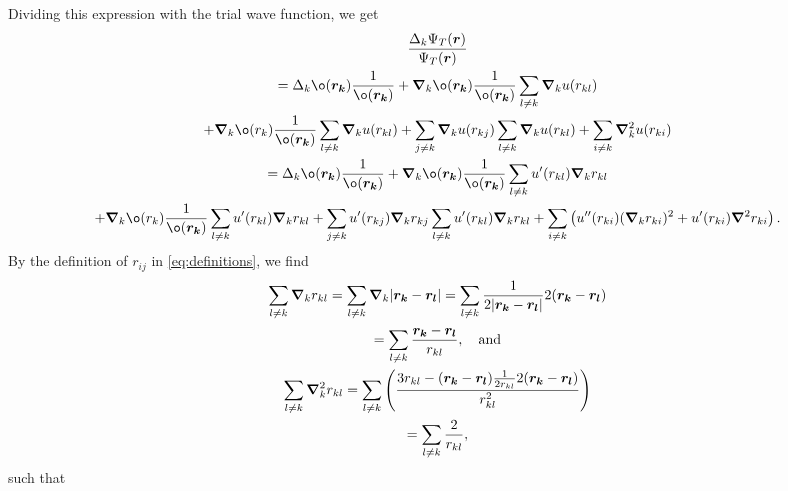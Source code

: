 Dividing this expression with the trial wave function, we get
\begin{gather*}
	\frac{\Delta _{k} \Psi _{T}(\boldsymbol{r})}{\Psi _{T}(\boldsymbol{r})}\\
	=\Delta _{k}ø(\boldsymbol{r_k})\frac{1}{ø(\boldsymbol{r_k})} + \grad _{k}ø(\boldsymbol{r_k}) \frac{1}{ø(\boldsymbol{r_k})} \sum_{l \neq  k} \boldsymbol{\nabla} _ku(r _{kl})\\
	+\boldsymbol{ \nabla }_kø(r_k)  \frac{1}{ø(\boldsymbol{r_k})} \sum_{l
		\neq  k} \boldsymbol{\nabla} _ku(r _{kl}) + \sum_{j \neq k}^{}
	\grad_ku(r _{kj})\sum_{l \neq k}^{} \grad_ku(r _{kl})
	+\sum_{i \neq k} \grad^2 _ku(r _{ki})\\
	=\Delta _{k}ø(\boldsymbol{r_k})\frac{1}{ø(\boldsymbol{r_k})} + \grad
	_{k}ø(\boldsymbol{r_k}) \frac{1}{ø(\boldsymbol{r_k})} \sum_{l \neq  k}
	u'(r _{kl})\boldsymbol{\nabla} _kr _{kl} \\
	+\boldsymbol{ \nabla }_kø(r_k)  \frac{1}{ø(\boldsymbol{r_k})} \sum_{l
		\neq  k} u'(r _{kl})\boldsymbol{\nabla} _k r _{kl}+ \sum_{j \neq k}^{}
	u'(r _{kj})\grad_k r _{kj}\sum_{l \neq k}^{} u'(r _{kl})\grad_k r _{kl}
	+\sum_{i \neq k} \left(u''(r _{ki})(\grad _k r _{ki})^2+u'(r _{ki})\grad ^2
	r _{ki}\right).
\end{gather*}
By the definition of $r _{ij}$ in \autoref{eq:definitions}, we find
\begin{gather*}
	\sum_{l \neq k }^{} \grad _k r _{kl} = \sum_{l \neq k }^{} \grad _k |\boldsymbol{r_k}-\boldsymbol{r_l}| = \sum_{l \neq k }^{} \frac{1}{2|\boldsymbol{r_k}-\boldsymbol{r_l}|}2(\boldsymbol{r_k}-\boldsymbol{r_l})\\
	= \sum_{l \neq k }^{} \frac{\boldsymbol{r_k}-\boldsymbol{r_l}}{r _{kl}}, \quad \text{and}\\
	\sum_{l \neq k}^{} \grad^2 _k r _{kl} = \sum_{l \neq k}^{} \left( \frac{3r _{kl}-(\boldsymbol{r_k}-\boldsymbol{r_l})\frac{1}{2r _{kl}}2(\boldsymbol{r_k}-\boldsymbol{r_l})}{r _{kl}^2}\right)\\
	= \sum_{l \neq k}^{} \frac{2}{r _{kl}} ,
\end{gather*}
such that
